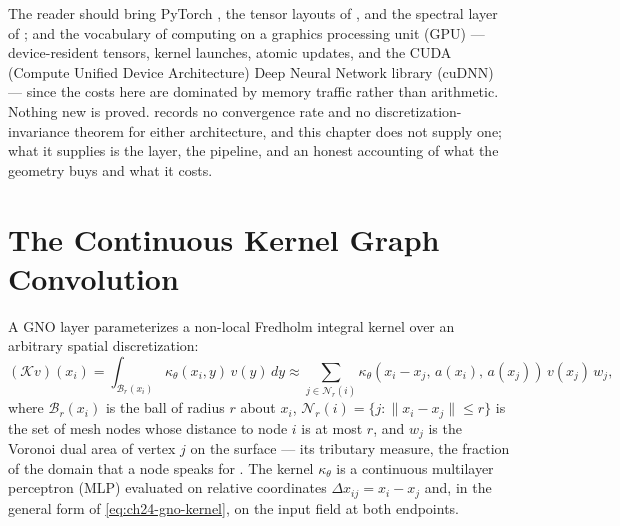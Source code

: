 The reader should bring PyTorch \cite{paszke2019pytorch}, the tensor layouts of
, and the spectral layer of
; and the vocabulary of computing
on a graphics processing unit (GPU) --- device-resident tensors, kernel launches, atomic
updates, and the CUDA (Compute Unified Device Architecture) Deep Neural Network library
(cuDNN) --- since the costs here are dominated by memory traffic rather than arithmetic.
Nothing new is proved.  records
no convergence rate and no discretization-invariance theorem for either architecture, and this
chapter does not supply one; what it supplies is the layer, the pipeline, and an honest
accounting of what the geometry buys and what it costs.

\section{The Continuous Kernel Graph Convolution}
\label{sec:ch24-continuous-kernel}

A GNO layer \cite{li2023geometry} parameterizes a non-local Fredholm integral kernel over an
arbitrary spatial discretization:
\begin{equation}
  \label{eq:ch24-gno-kernel}
  (\mathcal{K} v)(x_i) = \int_{\mathcal{B}_r(x_i)} \kappa_\theta(x_i, y) \, v(y) \, dy \approx
  \sum_{j \in \mathcal{N}_r(i)} \kappa_\theta(x_i - x_j, \, a(x_i), \, a(x_j)) \, v(x_j) \, w_j,
\end{equation}
where $\mathcal{B}_r(x_i)$ is the ball of radius $r$ about $x_i$,
 $\mathcal{N}_r(i) = \{j : \|x_i -
x_j\| \le r\}$ is the set of mesh nodes whose distance to node $i$ is at most $r$, and $w_j$
is the Voronoi dual area of vertex $j$ on the surface --- its tributary measure, the fraction
of the domain that a node speaks for
. The kernel
$\kappa_\theta$ is a continuous multilayer perceptron (MLP) evaluated on relative coordinates
$\Delta x_{ij} = x_i - x_j$ and, in the general form of \eqref{eq:ch24-gno-kernel}, on the
input field at both endpoints.

